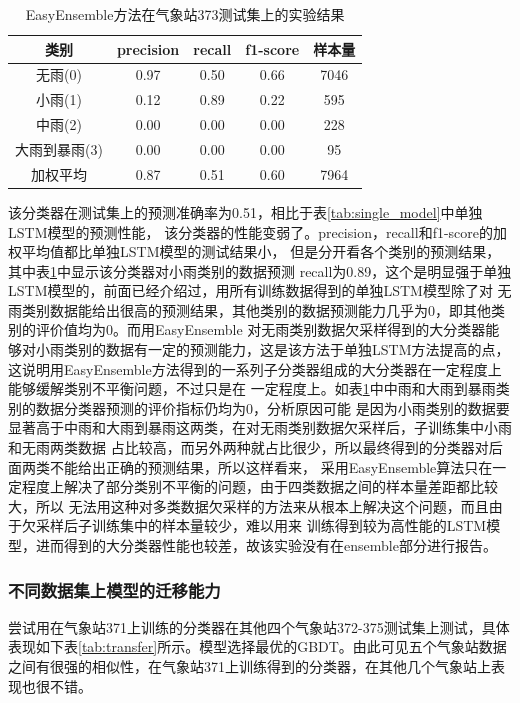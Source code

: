 \documentclass[UTF8]{ctexart}
\begin{document}
\begin{table}[htb]
  \centering
  \begin{minipage}[t]{\linewidth}
  \centering
  \caption{EasyEnsemble方法在气象站373测试集上的实验结果}
  \label{tab:easyensemble}
    \begin{tabular}{ccccc}
      \toprule[1pt]
      类别 & precision & recall & f1-score & 样本量\\
      \midrule[0.5pt]
      无雨(0) & 0.97 & 0.50 & 0.66 & 7046\\
      小雨(1) & 0.12 & 0.89 & 0.22 & 595 \\
      中雨(2) & 0.00 & 0.00 & 0.00 & 228 \\
      大雨到暴雨(3) & 0.00 & 0.00 & 0.00 & 95\\
      加权平均 & 0.87 & 0.51 & 0.60 & 7964\\
      \bottomrule[1pt]
    \end{tabular}
  \end{minipage}
\end{table}

该分类器在测试集上的预测准确率为0.51，相比于表\ref{tab:single_model}中单独LSTM模型的预测性能，
该分类器的性能变弱了。precision，recall和f1-score的加权平均值都比单独LSTM模型的测试结果小，
但是分开看各个类别的预测结果，其中表\ref{tab:easyensemble}中显示该分类器对小雨类别的数据预测
recall为0.89，这个是明显强于单独LSTM模型的，前面已经介绍过，用所有训练数据得到的单独LSTM模型除了对
无雨类别数据能给出很高的预测结果，其他类别的数据预测能力几乎为0，即其他类别的评价值均为0。而用EasyEnsemble
对无雨类别数据欠采样得到的大分类器能够对小雨类别的数据有一定的预测能力，这是该方法于单独LSTM方法提高的点，
这说明用EasyEnsemble方法得到的一系列子分类器组成的大分类器在一定程度上能够缓解类别不平衡问题，不过只是在
一定程度上。如表\ref{tab:easyensemble}中中雨和大雨到暴雨类别的数据分类器预测的评价指标仍均为0，分析原因可能
是因为小雨类别的数据要显著高于中雨和大雨到暴雨这两类，在对无雨类别数据欠采样后，子训练集中小雨和无雨两类数据
占比较高，而另外两种就占比很少，所以最终得到的分类器对后面两类不能给出正确的预测结果，所以这样看来，
采用EasyEnsemble算法只在一定程度上解决了部分类别不平衡的问题，由于四类数据之间的样本量差距都比较大，所以
无法用这种对多类数据欠采样的方法来从根本上解决这个问题，而且由于欠采样后子训练集中的样本量较少，难以用来
训练得到较为高性能的LSTM模型，进而得到的大分类器性能也较差，故该实验没有在ensemble部分进行报告。

\subsubsection{不同数据集上模型的迁移能力}
尝试用在气象站371上训练的分类器在其他四个气象站372-375测试集上测试，具体表现如下表\ref{tab:transfer}所示。模型选择最优的GBDT。由此可见五个气象站数据之间有很强的相似性，在气象站371上训练得到的分类器，在其他几个气象站上表现也很不错。
\end{document}
